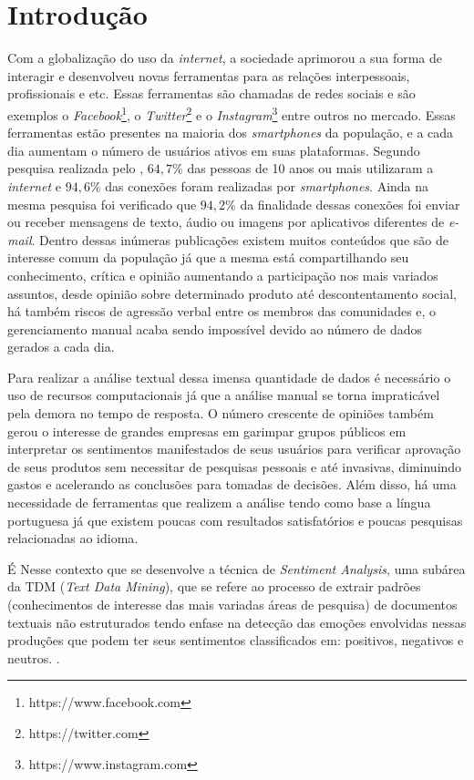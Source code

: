 \chapter{Introdução}
\label{cap:Introducao}
Com a globalização do uso da \textit{internet}, a sociedade aprimorou a sua forma de interagir e desenvolveu novas ferramentas para as relações interpessoais, profissionais e etc. Essas ferramentas são chamadas de redes sociais e são exemplos o \textit{Facebook}\footnote{https://www.facebook.com}, o \textit{Twitter}\footnote{https://twitter.com} e o \textit{Instagram}\footnote{https://www.instagram.com} entre outros no mercado. Essas ferramentas estão presentes na maioria dos \textit{smartphones} da população, e a cada dia aumentam o número de usuários ativos em suas plataformas. Segundo pesquisa realizada pelo , $64,7\%$ das pessoas de 10 anos ou mais utilizaram a \textit{internet} e $94,6\%$ das conexões foram realizadas por \textit{smartphones}. Ainda na mesma pesquisa foi verificado que $94,2\%$ da finalidade dessas conexões foi enviar ou receber mensagens de texto, áudio ou imagens por aplicativos diferentes de \textit{e-mail}. Dentro dessas inúmeras publicações existem muitos conteúdos que são de interesse comum da população já que a mesma está compartilhando seu conhecimento, crítica e opinião aumentando a participação nos mais variados assuntos, desde opinião sobre determinado produto até descontentamento social, há também riscos de agressão verbal entre os membros das comunidades e, o gerenciamento manual acaba sendo impossível devido ao número de dados gerados a cada dia.

Para realizar a análise textual dessa imensa quantidade de dados é necessário o uso de recursos computacionais já que a análise manual se torna impraticável  pela demora no tempo de resposta. O número crescente de opiniões também gerou o interesse de grandes empresas em garimpar grupos públicos em interpretar os sentimentos manifestados de seus usuários para verificar aprovação de seus produtos sem necessitar de pesquisas pessoais e até invasivas, diminuindo gastos e acelerando as conclusões para tomadas de decisões. Além disso, há uma necessidade de ferramentas que realizem a análise tendo como base a língua portuguesa já que existem poucas com resultados satisfatórios e poucas pesquisas relacionadas ao idioma.

É Nesse contexto que se desenvolve a técnica de \textit{Sentiment Analysis}, uma subárea da TDM (\textit{Text Data Mining})\cite{Hearst:1999:UTD:1034678.1034679}, que se refere ao processo de extrair padrões (conhecimentos de interesse das mais variadas áreas de pesquisa) de documentos textuais não estruturados tendo enfase na detecção das emoções envolvidas nessas produções que podem ter seus sentimentos classificados em: positivos, negativos e neutros. \cite{Li:2010:SAG:2898607.2898826}. 

